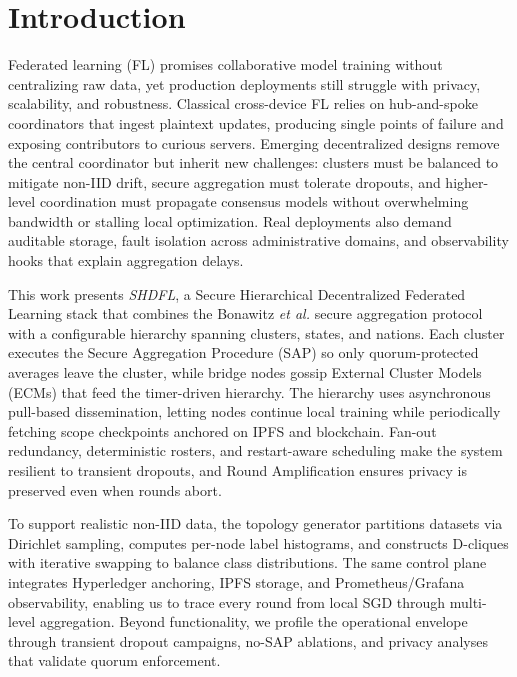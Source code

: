 \section{Introduction}\label{sec1}

Federated learning (FL) promises collaborative model training without centralizing raw data, yet production deployments still struggle with privacy, scalability, and robustness. Classical cross-device FL relies on hub-and-spoke coordinators that ingest plaintext updates, producing single points of failure and exposing contributors to curious servers. Emerging decentralized designs remove the central coordinator but inherit new challenges: clusters must be balanced to mitigate non-IID drift, secure aggregation must tolerate dropouts, and higher-level coordination must propagate consensus models without overwhelming bandwidth or stalling local optimization. Real deployments also demand auditable storage, fault isolation across administrative domains, and observability hooks that explain aggregation delays.

This work presents \emph{SHDFL}, a Secure Hierarchical Decentralized Federated Learning stack that combines the Bonawitz \emph{et al.} secure aggregation protocol with a configurable hierarchy spanning clusters, states, and nations. Each cluster executes the Secure Aggregation Procedure (SAP) so only quorum-protected averages leave the cluster, while bridge nodes gossip External Cluster Models (ECMs) that feed the timer-driven hierarchy. The hierarchy uses asynchronous pull-based dissemination, letting nodes continue local training while periodically fetching scope checkpoints anchored on IPFS and blockchain. Fan-out redundancy, deterministic rosters, and restart-aware scheduling make the system resilient to transient dropouts, and Round Amplification ensures privacy is preserved even when rounds abort.

To support realistic non-IID data, the topology generator partitions datasets via Dirichlet sampling, computes per-node label histograms, and constructs D-cliques with iterative swapping to balance class distributions. The same control plane integrates Hyperledger anchoring, IPFS storage, and Prometheus/Grafana observability, enabling us to trace every round from local SGD through multi-level aggregation. Beyond functionality, we profile the operational envelope through transient dropout campaigns, no-SAP ablations, and privacy analyses that validate quorum enforcement.

